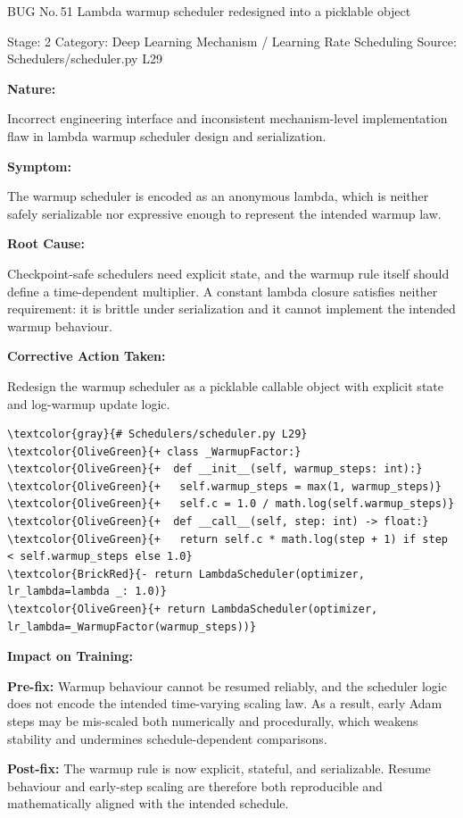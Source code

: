\documentclass[10pt]{article}
\newcommand{\FieldLabel}[1]{%
 {\bfseries #1:}\par
}
\begin{document}
\begin{bugbox}{BUG No.\,51 \quad Lambda warmup scheduler redesigned into a picklable object}
{\color{MetaGray}\small Stage: 2 \;\textbar\; Category: Deep Learning Mechanism / Learning Rate Scheduling \;\textbar\; Source: Schedulers/scheduler.py L29\par}
\vspace{0.22em}
\FieldLabel{Nature}
Incorrect engineering interface and inconsistent mechanism-level implementation flaw in lambda warmup scheduler design and serialization.
\par
\vspace{0.35em}
\FieldLabel{Symptom}
The warmup scheduler is encoded as an anonymous lambda, which is neither safely serializable nor expressive enough to represent the intended warmup law.
\par
\vspace{0.35em}
\FieldLabel{Root Cause}
Checkpoint-safe schedulers need explicit state, and the warmup rule itself should define a time-dependent multiplier. A constant lambda closure satisfies neither requirement: it is brittle under serialization and it cannot implement the intended warmup behaviour.
\par
\vspace{0.35em}
\FieldLabel{Corrective Action Taken}
Redesign the warmup scheduler as a picklable callable object with explicit state and log-warmup update logic.
\par
\vspace{0.35em}
\begin{Verbatim}[commandchars=\\\{\},fontsize=\footnotesize,breaklines=true,breaksymbol={},frame=leftline,framerule=2pt,rulecolor=\color{gray!40},xleftmargin=6pt,formatcom=\singlespacing]
\textcolor{gray}{# Schedulers/scheduler.py L29}
\textcolor{OliveGreen}{+ class _WarmupFactor:}
\textcolor{OliveGreen}{+  def __init__(self, warmup_steps: int):}
\textcolor{OliveGreen}{+   self.warmup_steps = max(1, warmup_steps)}
\textcolor{OliveGreen}{+   self.c = 1.0 / math.log(self.warmup_steps)}
\textcolor{OliveGreen}{+  def __call__(self, step: int) -> float:}
\textcolor{OliveGreen}{+   return self.c * math.log(step + 1) if step < self.warmup_steps else 1.0}
\textcolor{BrickRed}{- return LambdaScheduler(optimizer, lr_lambda=lambda _: 1.0)}
\textcolor{OliveGreen}{+ return LambdaScheduler(optimizer, lr_lambda=_WarmupFactor(warmup_steps))}
\end{Verbatim}
\vspace{0.22em}
\FieldLabel{Impact on Training}
\textbf{Pre-fix:} Warmup behaviour cannot be resumed reliably, and the scheduler logic does not encode the intended time-varying scaling law. As a result, early Adam steps may be mis-scaled both numerically and procedurally, which weakens stability and undermines schedule-dependent comparisons.\par\smallskip
\textbf{Post-fix:} The warmup rule is now explicit, stateful, and serializable. Resume behaviour and early-step scaling are therefore both reproducible and mathematically aligned with the intended schedule.
\par
\vspace{0.35em}
\end{bugbox}
\end{document}
